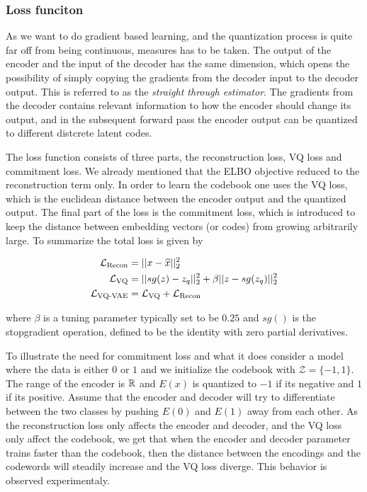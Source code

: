 \documentclass[../../thesis.tex]{subfiles}
\begin{document}
\subsubsection{Loss funciton}
As we want to do gradient based learning, and the quantization process is quite far off from being continuous, measures has to be taken. The output of the encoder and the input of the decoder has the same dimension, which opens the possibility of simply copying the gradients from the decoder input to the decoder output. This is referred to as the \textit{straight through estimator}. The gradients from the decoder contains relevant information to how the encoder should change its output, and in the subsequent forward pass the encoder output can be quantized to different distcrete latent codes.\newline

The loss function consists of three parts, the reconstruction loss, VQ loss and commitment loss. We already mentioned that the ELBO objective reduced to the reconstruction term only. In order to learn the codebook one uses the VQ loss, which is the euclidean distance between the encoder output and the quantized output. The final part of the loss is the commitment loss, which is introduced to keep the distance between embedding vectors (or codes) from growing arbitrarily large. To summarize the total loss is given by

    \begin{equation}        
        \begin{aligned}
            \mathcal{L}_{\text{Recon}} &= ||x - \widehat{x}||_2^2\\
            \mathcal{L}_{\text{VQ}} &= ||sg(z) - z_q||_2^2 +\beta||z - sg(z_q)||_2^2\\
            \mathcal{L}_{\text{VQ-VAE}} &= \mathcal{L}_{\text{VQ}} + \mathcal{L}_{\text{Recon}}
        \end{aligned}
    \end{equation}

where $\beta$ is a tuning parameter typically set to be $0.25$ and $sg()$ is the stopgradient operation, defined to be the identity with zero partial derivatives. \newline

To illustrate the need for commitment loss and what it does consider a model where the data is either $0$ or $1$ and we initialize the codebook with $\mathcal{Z} = \{-1,1\}$.  The range of the encoder is $\mathbb{R}$ and $E(x)$ is quantized to $-1$ if its negative and $1$ if its positive. Assume that the encoder and decoder will try to differentiate between the two classes by pushing $E(0)$ and $E(1)$ away from each other. As the reconstruction loss only affects the encoder and decoder, and the VQ loss only affect the codebook, we get that when the encoder and decoder parameter trains faster than the codebook, then the distance between the encodings and the codewords will steadily increase and the VQ loss diverge. This behavior is observed experimentaly. \newline 
\end{document}
